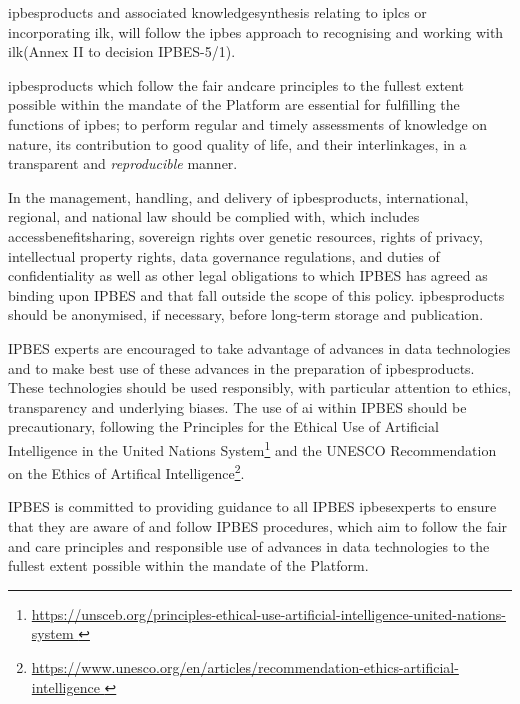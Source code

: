 \documentclass{article}
\begin{document}
\glspl{ipbesproduct} and associated \gls{knowledgesynthesis} relating to \glspl{iplc} or incorporating \gls{ilk}, will follow the \gls{ipbes} approach to recognising and working with \gls{ilk}(Annex II to decision IPBES-5/1).

\glspl{ipbesproduct} which follow the \gls{fair} and\gls{care} principles to the fullest extent possible within the mandate of the Platform are essential for fulfilling the functions of \gls{ipbes}; to perform regular and timely assessments of \gls{knowledge} on nature, its contribution to good quality of life, and their interlinkages, in a transparent and \textit{reproducible} manner.

In the management, handling, and delivery of \glspl{ipbesproduct}, international, regional, and national law should be complied with, which includes \gls{accessbenefitsharing}, sovereign rights over genetic resources, rights of privacy, intellectual property rights, \gls{data} governance regulations, and duties of confidentiality as well as other legal obligations to which IPBES has agreed as binding upon IPBES and that fall outside the scope of this policy. \glspl{ipbesproduct} should be anonymised, if necessary, before long-term storage and publication.

IPBES experts are encouraged to take advantage of advances in \gls{data} technologies and to make best use of these advances in the preparation of \glspl{ipbesproduct}. These technologies should be used responsibly, with particular attention to ethics, transparency and underlying biases. The use of \gls{ai} within IPBES should be precautionary, following the Principles for the Ethical Use of Artificial Intelligence in the United Nations System\footnote{\href{https://unsceb.org/principles-ethical-use-artificial-intelligence-united-nations-system }{https://unsceb.org/principles-ethical-use-artificial-intelligence-united-nations-system }} and the UNESCO Recommendation on the Ethics of Artifical Intelligence\footnote{\href{https://www.unesco.org/en/articles/recommendation-ethics-artificial-intelligence }{https://www.unesco.org/en/articles/recommendation-ethics-artificial-intelligence }}.

IPBES is committed to providing guidance to all IPBES \glspl{ipbesexpert} to ensure that they are aware of and follow IPBES procedures, which aim to follow the \gls{fair} and \gls{care} principles and responsible use of advances in \gls{data} technologies to the fullest extent possible within the mandate of the Platform.
\end{document}
